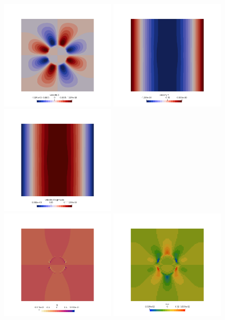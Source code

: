 \includegraphics[width=5.7cm]{images/stokes_sphere2D/stone18_BO/u}
\includegraphics[width=5.7cm]{images/stokes_sphere2D/stone18_BO/v}
\includegraphics[width=5.7cm]{images/stokes_sphere2D/stone18_BO/vel}\\
\includegraphics[width=5.7cm]{images/stokes_sphere2D/stone18_BO/press}
\includegraphics[width=5.7cm]{images/stokes_sphere2D/stone18_BO/exx}
